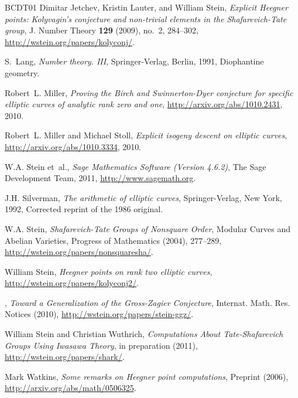 \documentclass[preprint,12pt]{elsarticle}
\theoremstyle{plain}
\theoremstyle{definition}
\begin{document}
\begin{thebibliography}{BCDT01}
Dimitar Jetchev, Kristin Lauter, and William Stein, \emph{Explicit {H}eegner
  points: {K}olyvagin's conjecture and non-trivial elements in the
  {S}hafarevich-{T}ate group}, J. Number Theory \textbf{129} (2009), no.~2,
  284--302, \url{http://wstein.org/papers/kolyconj/}. 

S.~Lang, \emph{Number theory. {I}{I}{I}}, Springer-Verlag, Berlin, 1991,
  Diophantine geometry. 

Robert~L. Miller, \emph{Proving the {B}irch and {S}winnerton-{D}yer conjecture
  for specific elliptic curves of analytic rank zero and one},
  \url{http://arxiv.org/abs/1010.2431}, 2010.

Robert~L. Miller and Michael Stoll, \emph{Explicit isogeny descent on elliptic
  curves}, \url{http://arxiv.org/abs/1010.3334}, 2010.

W.\thinspace{}A. Stein et~al., \emph{{S}age {M}athematics {S}oftware ({V}ersion
  4.6.2)}, The Sage Development Team, 2011, \url{http://www.sagemath.org}.

J.\thinspace{}H. Silverman, \emph{The arithmetic of elliptic curves},
  Springer-Verlag, New York, 1992, Corrected reprint of the 1986 original.

W.\thinspace{}A. Stein, \emph{Shafarevich-{T}ate {G}roups of {N}onsquare
  {O}rder}, Modular Curves and Abelian Varieties, Progress of Mathematics
  (2004), 277--289, \url{http://wstein.org/papers/nonsquaresha/}.

William Stein, \emph{Heegner points on rank two elliptic curves},
  \url{http://wstein.org/papers/kolyconj2/}.

\bysame, \emph{Toward a {G}eneralization of the {G}ross-{Z}agier {C}onjecture},
  Internat. Math. Res. Notices (2010),
  \url{http://wstein.org/papers/stein-ggz/}.

William Stein and Christian Wuthrich, \emph{Computations {A}bout
  {T}ate-{S}hafarevich {G}roups {U}sing {I}wasawa {T}heory}, in preparation
  (2011), \url{http://wstein.org/papers/shark/}.

Mark Watkins, \emph{Some remarks on {H}eegner point computations}, Preprint
  (2006), \url{http://arxiv.org/abs/math/0506325}.


\end{thebibliography}
\end{document}
